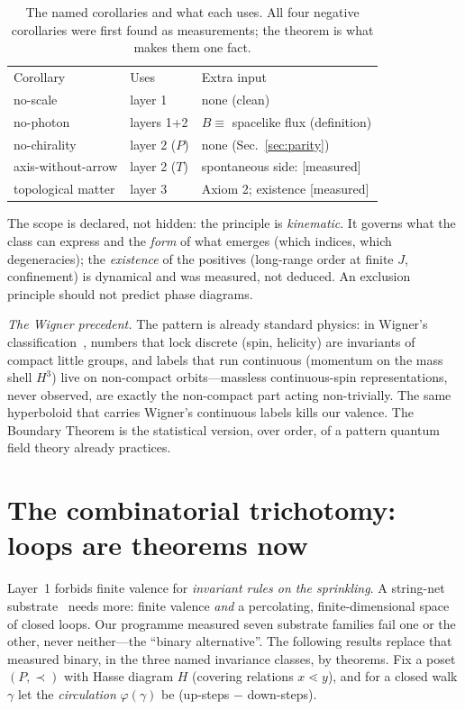 \documentclass[aps,prd,reprint,nofootinbib,superscriptaddress,floatfix]{revtex4-2}
\theoremstyle{definition}
\begin{document}
\begin{table}[b]
\caption{\label{tab:corollaries}The named corollaries and what each uses. All four
negative corollaries were first found as measurements; the theorem is what makes them
one fact.}
\begin{ruledtabular}
\begin{tabular}{llp{3.1cm}}
Corollary & Uses & Extra input \\
\colrule
no-scale & layer 1 & none (clean) \\
no-photon & layers 1+2 & $B\equiv$ spacelike flux (definition) \\
no-chirality & layer 2 ($P$) & none (Sec.~\ref{sec:parity}) \\
axis-without-arrow & layer 2 ($T$) & spontaneous side: [measured] \\
topological matter & layer 3 & Axiom 2; existence [measured] \\
\end{tabular}
\end{ruledtabular}
\end{table}

The scope is declared, not hidden: the principle is \emph{kinematic}. It governs what
the class can express and the \emph{form} of what emerges (which indices, which
degeneracies); the \emph{existence} of the positives (long-range order at finite $J$,
confinement) is dynamical and was measured, not deduced. An exclusion principle should
not predict phase diagrams.

\emph{The Wigner precedent.} The pattern is already standard physics: in Wigner's
classification~\cite{Wigner1939}, numbers that lock discrete (spin, helicity) are
invariants of compact little groups, and labels that run continuous (momentum on the
mass shell $H^3$) live on non-compact orbits---massless continuous-spin representations,
never observed, are exactly the non-compact part acting non-trivially. The same
hyperboloid that carries Wigner's continuous labels kills our valence. The Boundary
Theorem is the statistical version, over order, of a pattern quantum field theory
already practices.

\section{The combinatorial trichotomy: loops are theorems now}
\label{sec:trichotomy}

Layer~1 forbids finite valence for \emph{invariant rules on the sprinkling}. A
string-net substrate~\cite{LevinWen2005,WenComplement} needs more: finite valence
\emph{and} a percolating, finite-dimensional space of closed loops. Our programme
measured seven substrate families fail one or the other, never neither---the ``binary
alternative''. The following results replace that measured binary, in the three named
invariance classes, by theorems. Fix a poset $(P,\prec)$ with Hasse diagram $H$ (covering
relations $x\lessdot y$), and for a closed walk $\gamma$ let the \emph{circulation}
$\varphi(\gamma)$ be (up-steps $-$ down-steps).
\end{document}
